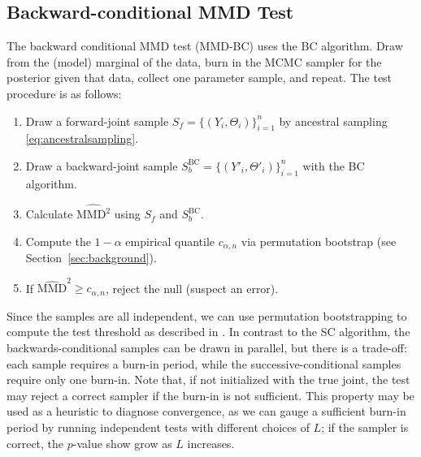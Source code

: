 \documentclass{article}
\begin{document}
\subsection{Backward-conditional MMD Test}
The backward conditional MMD test (MMD-BC) uses the BC algorithm.
Draw from the (model) marginal of the data, burn in the MCMC sampler for the posterior given that data, collect one parameter sample, and repeat.
The test procedure is as follows:
\begin{enumerate}
    \item Draw a forward-joint sample $S_f=\{(Y_i,\Theta_i)\}_{i=1}^n$ by ancestral sampling \eqref{eq:ancestralsampling}.
    \item Draw a backward-joint sample $S_{b}^{\mathrm{BC}}=\{(Y'_i, \Theta'_{i})\}_{i=1}^{n}$ with the BC algorithm.
    \item Calculate $\widehat{\mathrm{MMD}^2}$ using $S_f$ and $S_b^{\mathrm{BC}}$.
    \item Compute the $1-\alpha$ empirical quantile $c_{\alpha, n}$ via permutation bootstrap (see Section~\ref{sec:background}).  
    \item If $\widehat{\mathrm{MMD}}^{2} \geq c_{\alpha, n}$, reject the null (suspect an error). 
\end{enumerate}
Since the samples are all independent, we can use permutation bootstrapping to compute the test threshold as described in \cite{gretton_kernel_2012}. 
In contrast to the SC algorithm, the backwards-conditional samples can be drawn in parallel, but there is a trade-off: each sample requires a burn-in period, while the successive-conditional samples require only one burn-in.
Note that, if not initialized with the true joint, the test may reject a correct sampler if the burn-in is not sufficient. 
This property may be used as a heuristic to diagnose convergence, as we can gauge a sufficient burn-in period by running independent tests with different choices of $L$; if the sampler is correct, the $p$-value show grow as $L$ increases. 
\end{document}
